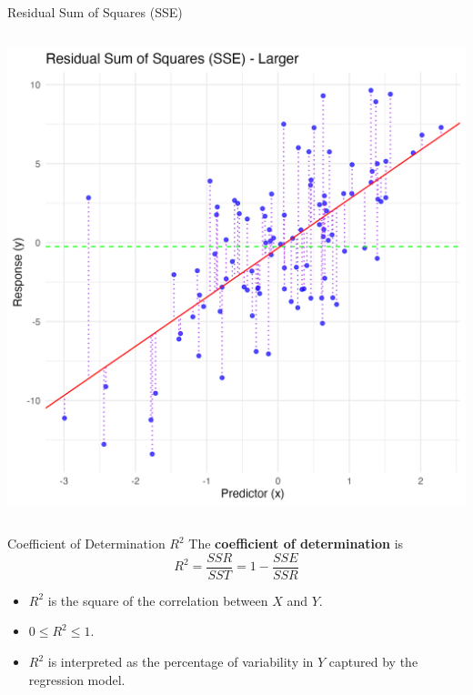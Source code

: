 \documentclass{beamer}
\begin{document}
\begin{frame}{Residual Sum of Squares (SSE)}
\begin{columns}
\begin{column}{0.5\linewidth}
            \includegraphics[width=\linewidth]{figures/sse_larger.png}
        \end{column}
    \end{columns}
\end{frame}

\begin{frame}{Coefficient of Determination $R^2$}
    The \textbf{coefficient of determination} is 
    \begin{equation*}
        R^2 = \frac{SSR}{SST} = 1 - \frac{SSE}{SSR}
    \end{equation*}
    \begin{itemize}
        \item $R^2$ is the square of the correlation between $X$ and $Y$.
        \item $0\leq R^2\leq 1$.
        \item $R^2$ is interpreted as the percentage of variability in $Y$ captured by the regression model.
    \end{itemize}
\end{frame}
\end{document}
